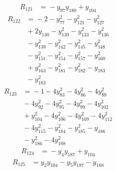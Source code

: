 \begin{align*}
R_{121} &={} -y_{97}y_{180} +y_{104}
\end{align*}
\begin{align*}
R_{122} &={} -2 -y_{77}^{2} -y_{121}^{2} -y_{127}^{2} \\
 &{} +2y_{130} -y_{130}^{2} -y_{133}^{2} -y_{136}^{2} \\
 &{} -y_{139}^{2} -y_{142}^{2} -y_{145}^{2} -y_{148}^{2} \\
 &{} -y_{151}^{2} -y_{154}^{2} -y_{157}^{2} -y_{160}^{2} \\
 &{} +y_{163}^{2} -y_{181}^{2} -y_{182}^{2} -y_{183} \\
 &{} -y_{183}^{2}
\end{align*}
\begin{align*}
R_{123} &={} -1 -4y_{83}^{2} -4y_{86}^{2} -4y_{89}^{2} \\
 &{} -4y_{92}^{2} -4y_{95}^{2} -4y_{99}^{2} -4y_{102}^{2} \\
 &{} +y_{104}^{2} -4y_{106}^{2} -4y_{109}^{2} -4y_{112}^{2} \\
 &{} -4y_{115}^{2} -y_{184}^{2} -y_{185}^{2} -y_{186} \\
 &{} -y_{186}^{2} -4y_{188}^{2}
\end{align*}
\begin{align*}
R_{124} &={} -y_{4}y_{187} +y_{104}
\end{align*}
\begin{align*}
R_{125} &={} y_{2}y_{104} -y_{5}y_{187} -y_{188}
\end{align*}
